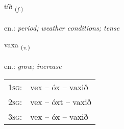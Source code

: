 \documentclass[frontgrid, backgrid]{flacards}\usepackage[]{graphicx}\usepackage[]{xcolor}
\begin{document}
\renewcommand{\flhead}{\vskip5pt \fboxsep=0pt {\small\bfseries\footnotesize Nafnorð | Noun}}
\renewcommand{\fcfoot}{\vskip5pt \fboxsep=0pt \hspace{2pt}{\small\bfseries\footnotesize 1K}}

\renewcommand{\blhead}{\vskip5pt {\small\bfseries\footnotesize Nafnorð | Noun }}
\renewcommand{\bcfoot}{\vskip5pt \hspace{2pt}{\small\bfseries\footnotesize 1K}}


{tíð \small{\textsubscript{(\textit{f.})}} \\[1ex] %
\textphonetic{[tʰiːð]} \\
en.: \emph{period; weather conditions; tense} \\  [2ex]
\renewcommand*{\arraystretch}{0.8}
}

\renewcommand{\flhead}{\vskip5pt \fboxsep=0pt {\small\bfseries\footnotesize Sagnorð | Verb}}
\renewcommand{\fcfoot}{\vskip5pt \fboxsep=0pt \hspace{2pt}{\small\bfseries\footnotesize 1K}}

\renewcommand{\blhead}{\vskip5pt {\small\bfseries\footnotesize Sagnorð | Verb }}
\renewcommand{\bcfoot}{\vskip5pt \hspace{2pt}{\small\bfseries\footnotesize 1K}}


{vaxa \small{\textsubscript{(\textit{v.})}} \\[1ex] %
\textphonetic{[vaksa]} \\
en.: \emph{grow; increase} \\  [2ex]
\renewcommand*{\arraystretch}{0.8}
\begin{tabular}{p{1cm}l}
\textsc{1sg}: & vex -- óx -- vaxið \\ 
\textsc{2sg}: & vex -- óxt -- vaxið \\ 
\textsc{3sg}: & vex -- óx -- vaxið \\ 
\end{tabular}
}
\end{document}
